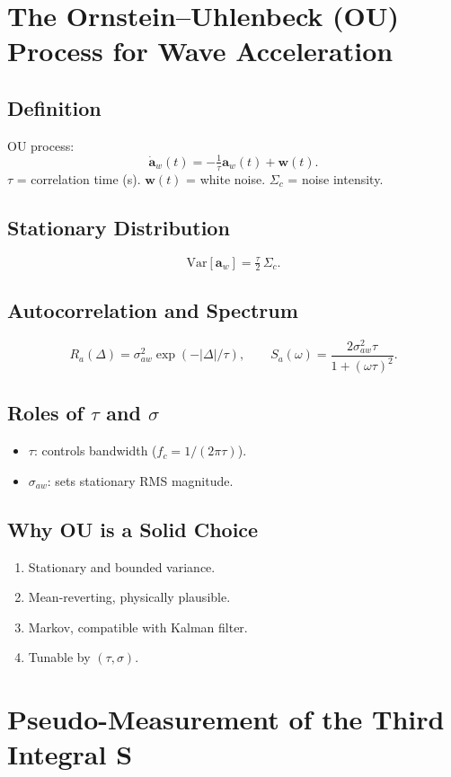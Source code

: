\documentclass[11pt]{article}
\begin{document}
\section{The Ornstein--Uhlenbeck (OU) Process for Wave Acceleration}

\subsection{Definition}
OU process:
\[
\dot{\bm a}_w(t) = -\tfrac{1}{\tau}\bm a_w(t) + \bm w(t).
\]
$\tau$ = correlation time (s).  
$\bm w(t)$ = white noise.  
$\Sigma_c$ = noise intensity.

\subsection{Stationary Distribution}
\[
\mathrm{Var}[\bm a_w] = \tfrac{\tau}{2}\,\Sigma_c.
\]

\subsection{Autocorrelation and Spectrum}
\[
R_{a}(\Delta) = \sigma_{aw}^2 \exp(-|\Delta|/\tau), \qquad
S_a(\omega) = \frac{2\sigma_{aw}^2 \tau}{1+(\omega\tau)^2}.
\]

\subsection{Roles of $\tau$ and $\sigma$}
\begin{itemize}
\item $\tau$: controls bandwidth ($f_c=1/(2\pi\tau)$).
\item $\sigma_{aw}$: sets stationary RMS magnitude.
\end{itemize}

\subsection{Why OU is a Solid Choice}
\begin{enumerate}
\item Stationary and bounded variance.
\item Mean-reverting, physically plausible.
\item Markov, compatible with Kalman filter.
\item Tunable by $(\tau,\sigma)$.
\end{enumerate}

\section{Pseudo-Measurement of the Third Integral $\bm S$}
\end{document}
